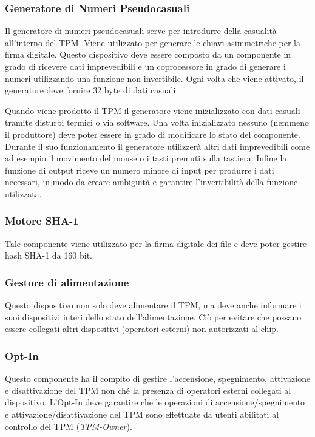 \subsubsection{Generatore di Numeri Pseudocasuali}
Il generatore di numeri pseudocasuali serve per introdurre della casualità all'interno del TPM. Viene utilizzato per generare le chiavi asimmetriche per la firma digitale. Questo dispositivo deve essere composto da un componente in grado di ricevere dati imprevedibili e un coprocessore in grado di generare i numeri utilizzando una funzione non invertibile. Ogni volta che viene attivato, il generatore deve fornire 32 byte di dati casuali.

Quando viene prodotto il TPM il generatore viene inizializzato con dati casuali tramite disturbi termici o via software. Una volta inizializzato nessuno (nemmeno il produttore) deve poter essere in grado di modificare lo stato del componente. Durante il suo funzionamento il generatore utilizzerà altri dati imprevedibili come ad esempio il movimento del mouse o i tasti premuti sulla tastiera. Infine la funzione di output riceve un numero minore di input per produrre i dati necessari, in modo da creare ambiguità e garantire l'invertibilità della funzione utilizzata.

\subsubsection{Motore SHA-1}
Tale componente viene utilizzato per la firma digitale dei file e deve poter gestire hash SHA-1 da 160 bit.

\subsubsection{Gestore di alimentazione}
Questo dispositivo non solo deve alimentare il TPM, ma deve anche informare i suoi dispositivi interi dello stato dell'alimentazione. Ciò per evitare che possano essere collegati altri dispositivi (operatori esterni) non autorizzati al chip.

\subsubsection{Opt-In}
Questo componente ha il compito di gestire l'accensione, spegnimento, attivazione e disattivazione del TPM non ché la presenza di operatori esterni collegati al dispositivo. L'Opt-In deve garantire che le operazioni di accensione/spegnimento e attivazione/disattivazione del TPM sono effettuate da utenti abilitati al controllo del TPM (\textit{TPM-Owner}).

